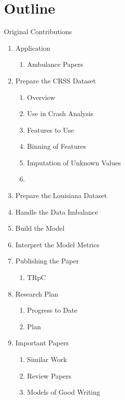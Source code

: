 \section{Outline}

Original Contributions


\begin{enumerate}
	\item Application
	\begin{enumerate}[label=\Alph*.]
		\item Ambulance Papers
	\end{enumerate}
	
	\item Prepare the CRSS Dataset
	\begin{enumerate}[label=\Alph*.]
		\item Overview
		\item Use in Crash Analysis
		\item Features to Use
		\item Binning of Features
		\item Imputation of Unknown Values
		\item
	\end{enumerate}
	
	\item Prepare the Louisiana Dataset
	
	\item Handle the Data Imbalance
	
	\item Build the Model
	
	\item Interpret the Model Metrics

	\item Publishing the Paper
	\begin{enumerate}[label=\Alph*.]
		\item TRpC	
	\end{enumerate}
	
	
	\item Research Plan
	\begin{enumerate}[label=\Alph*.]
		\item Progress to Date
		\item Plan	
	\end{enumerate}
	
	\item Important Papers
	\begin{enumerate}[label=\Alph*.]
		\item Similar Work
		\item Review Papers
		\item Models of Good Writing	
	\end{enumerate}
	
\end{enumerate}

\begin{comment}
	\begin{enumerate}[label=\Alph*.]
	
	\end{enumerate}

\end{comment}
